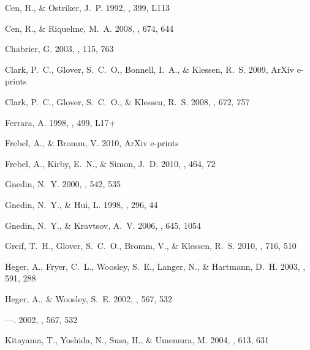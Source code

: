 \documentclass[apjl]{emulateapj}
\begin{document}
\begin{thebibliography}{50}
{Cen}, R., \& {Ostriker}, J.~P. 1992, \apjl, 399, L113

{Cen}, R., \& {Riquelme}, M.~A. 2008, \apj, 674, 644

{Chabrier}, G. 2003, \pasp, 115, 763

{Clark}, P.~C., {Glover}, S.~C.~O., {Bonnell}, I.~A., \& {Klessen}, R.~S. 2009,
  ArXiv e-prints

{Clark}, P.~C., {Glover}, S.~C.~O., \& {Klessen}, R.~S. 2008, \apj, 672, 757

{Ferrara}, A. 1998, \apjl, 499, L17+

{Frebel}, A., \& {Bromm}, V. 2010, ArXiv e-prints

{Frebel}, A., {Kirby}, E.~N., \& {Simon}, J.~D. 2010, \nat, 464, 72

{Gnedin}, N.~Y. 2000, \apj, 542, 535

{Gnedin}, N.~Y., \& {Hui}, L. 1998, \mnras, 296, 44

{Gnedin}, N.~Y., \& {Kravtsov}, A.~V. 2006, \apj, 645, 1054

{Greif}, T.~H., {Glover}, S.~C.~O., {Bromm}, V., \& {Klessen}, R.~S. 2010,
  \apj, 716, 510

{Heger}, A., {Fryer}, C.~L., {Woosley}, S.~E., {Langer}, N., \& {Hartmann},
  D.~H. 2003, \apj, 591, 288

{Heger}, A., \& {Woosley}, S.~E. 2002{}, \apj, 567, 532

---. 2002{}, \apj, 567, 532

{Kitayama}, T., {Yoshida}, N., {Susa}, H., \& {Umemura}, M. 2004, \apj, 613,
  631


\end{thebibliography}
\end{document}
